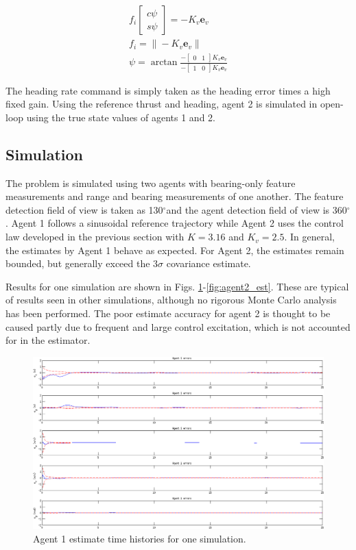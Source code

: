 \documentclass{aiaa-tc}
\newcommand{\degree}{\ensuremath{^\circ}}
\newcommand{\B}[1]{\textbf{#1}} %
\begin{document}
\begin{align}
f_i\begin{bmatrix}
c\psi \\
s\psi
\end{bmatrix} = -K_v \B{e}_v \\
f_i = \| -K_v \B{e}_v \| \\
\psi = \arctan{ \frac{-\begin{bmatrix}
0 & 1
\end{bmatrix} K_v\B{e}_v}{-\begin{bmatrix}
1 & 0
\end{bmatrix} K_v\B{e}_v }}
\end{align}

The heading rate command is simply taken as the heading error times a high fixed gain. Using the reference thrust and heading, agent 2 is simulated in open-loop using the true state values of agents 1 and 2.

\subsection{Simulation}

The problem is simulated using two agents with bearing-only feature measurements and range and bearing measurements of one another. The feature detection field of view is taken as 130\degree and the agent detection field of view is 360\degree. Agent 1 follows a sinusoidal reference trajectory while Agent 2 uses the control law developed in the previous section with $K = 3.16$ and $K_v = 2.5$. In general, the estimates by Agent 1 behave as expected. For Agent 2, the estimates remain bounded, but generally exceed the 3$\sigma$ covariance estimate. 

Results for one simulation are shown in Figs. \ref{fig:agent1_est}-\ref{fig:agent2_est}. These are typical of results seen in other simulations, although no rigorous Monte Carlo analysis has been performed. The poor estimate accuracy for agent 2 is thought to be caused partly due to frequent and large control excitation, which is not accounted for in the estimator. 

\begin{figure}[p]
\centering
\includegraphics[width=\textwidth]{agent1_est.png}
\caption{ Agent 1 estimate time histories for one simulation. }
\label{fig:agent1_est}
\end{figure}
\end{document}
